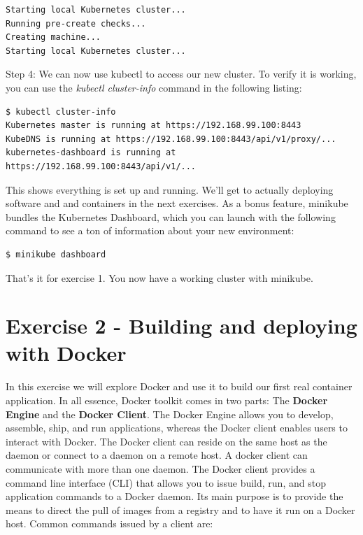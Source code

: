 \documentclass[a4paper,10pt]{article}
\begin{document}
\begin{lstlisting}[numbers=none, basicstyle=\mdseries]
Starting local Kubernetes cluster...
Running pre-create checks...
Creating machine...
Starting local Kubernetes cluster...
\end{lstlisting}

Step 4: We can now use kubectl to access our new cluster. To verify it is working, you can use the \textit{kubectl cluster-info} command in the following listing:

\begin{lstlisting}[numbers=none, basicstyle=\mdseries]
$ kubectl cluster-info
Kubernetes master is running at https://192.168.99.100:8443
KubeDNS is running at https://192.168.99.100:8443/api/v1/proxy/...
kubernetes-dashboard is running at https://192.168.99.100:8443/api/v1/...
\end{lstlisting}

This shows everything is set up and running. We'll get to actually deploying software and and containers in the next exercises. As a bonus feature, minikube bundles the Kubernetes Dashboard, which you can launch with the following command to see a ton of information about your new environment:

\begin{lstlisting}[numbers=none, basicstyle=\mdseries]
$ minikube dashboard
\end{lstlisting}

That's it for exercise 1. You now have a working cluster with minikube.

\pagebreak

\section{Exercise 2 - Building and deploying with Docker}

In this exercise we will explore Docker and use it to build our first real container application. In all essence, Docker toolkit comes in two parts: The \textbf{Docker Engine} and the \textbf{Docker Client}. The Docker Engine allows you to develop, assemble, ship, and run applications, whereas the Docker client enables users to interact with Docker. The Docker client can reside on the same host as the daemon or connect to a daemon on a remote host. A docker client can communicate with more than one daemon. The Docker client provides a command line interface (CLI) that allows you to issue build, run, and stop application commands to a Docker daemon. Its main purpose is to provide the means to direct the pull of images from a registry and to have it run on a Docker host. Common commands issued by a client are: \\
\end{document}

